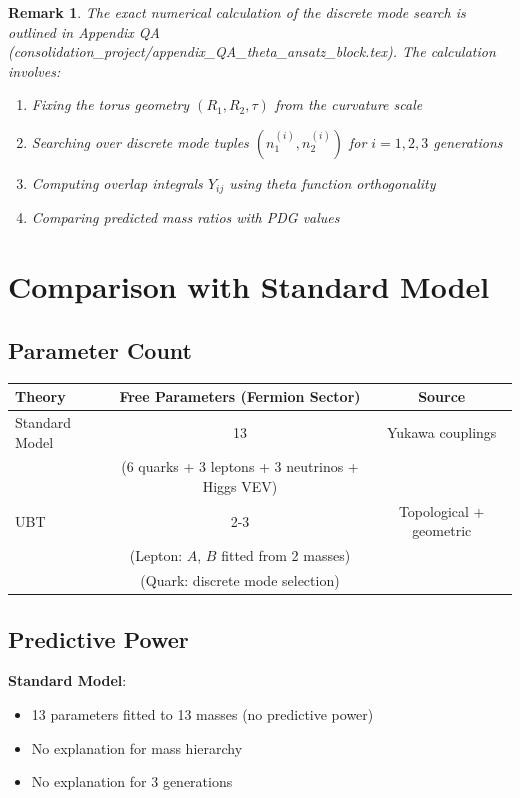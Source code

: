 \documentclass[12pt,a4paper]{article}
\newtheorem{remark}{Remark}[section]
\begin{document}
\begin{remark}
The exact numerical calculation of the discrete mode search is outlined in Appendix QA (consolidation\_project/appendix\_QA\_theta\_ansatz\_block.tex). The calculation involves:
\begin{enumerate}
    \item Fixing the torus geometry $(R_1, R_2, \tau)$ from the curvature scale
    \item Searching over discrete mode tuples $(n_1^{(i)}, n_2^{(i)})$ for $i=1,2,3$ generations
    \item Computing overlap integrals $Y_{ij}$ using theta function orthogonality
    \item Comparing predicted mass ratios with PDG values
\end{enumerate}
\end{remark}

\section{Comparison with Standard Model}

\subsection{Parameter Count}

\begin{center}
\begin{tabular}{lcc}
\hline
Theory & Free Parameters (Fermion Sector) & Source \\
\hline
Standard Model & 13 & Yukawa couplings \\
 & (6 quarks + 3 leptons + 3 neutrinos + Higgs VEV) & \\
UBT & 2-3 & Topological + geometric \\
 & (Lepton: $A$, $B$ fitted from 2 masses) & \\
 & (Quark: discrete mode selection) & \\
\hline
\end{tabular}
\end{center}

\subsection{Predictive Power}

\textbf{Standard Model}:
\begin{itemize}
    \item 13 parameters fitted to 13 masses (no predictive power)
    \item No explanation for mass hierarchy
    \item No explanation for 3 generations
\end{itemize}
\end{document}
